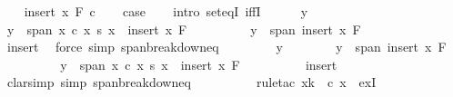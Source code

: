 \begin{isabellebody}
\isanewline
\ \ \isamarkupfalse%
\ {\isacharparenleft}{\kern0pt}insert\ x\ F\ c{\isacharparenright}{\kern0pt}\isanewline
\ \ \isamarkupfalse%
\ {\isacharquery}{\kern0pt}case\isanewline
\ \ \isamarkupfalse%
\ {\isacharparenleft}{\kern0pt}intro\ set{\isacharunderscore}{\kern0pt}eqI\ iffI{\isacharparenright}{\kern0pt}\isanewline
\ \ \ \ \isamarkupfalse%
\ y\isanewline
\ \ \ \ \ \ \isamarkupfalse%
\ {\isachardoublequoteopen}y\ {\isasymin}\ span\ {\isacharparenleft}{\kern0pt}{\isacharparenleft}{\kern0pt}{\isasymlambda}x{\isachardot}{\kern0pt}\ c\ x\ {\isacharasterisk}{\kern0pt}s\ x{\isacharparenright}{\kern0pt}\ {\isacharbackquote}{\kern0pt}\ insert\ x\ F{\isacharparenright}{\kern0pt}{\isachardoublequoteclose}\isanewline
\ \ \ \ \ \ \isamarkupfalse%
\ \isamarkupfalse%
\ {\isachardoublequoteopen}y\ {\isasymin}\ span\ {\isacharparenleft}{\kern0pt}insert\ x\ F{\isacharparenright}{\kern0pt}{\isachardoublequoteclose}\isanewline
\ \ \ \ \ \ \ \ \isamarkupfalse%
\ insert\ \isamarkupfalse%
\ {\isacharparenleft}{\kern0pt}force\ simp{\isacharcolon}{\kern0pt}\ span{\isacharunderscore}{\kern0pt}breakdown{\isacharunderscore}{\kern0pt}eq{\isacharparenright}{\kern0pt}\isanewline
\ \ \isamarkupfalse%
\isanewline
\ \ \ \ \isamarkupfalse%
\ y\isanewline
\ \ \ \ \ \ \isamarkupfalse%
\ {\isachardoublequoteopen}y\ {\isasymin}\ span\ {\isacharparenleft}{\kern0pt}insert\ x\ F{\isacharparenright}{\kern0pt}{\isachardoublequoteclose}\isanewline
\ \ \ \ \ \ \isamarkupfalse%
\ \isamarkupfalse%
\ {\isachardoublequoteopen}y\ {\isasymin}\ span\ {\isacharparenleft}{\kern0pt}{\isacharparenleft}{\kern0pt}{\isasymlambda}x{\isachardot}{\kern0pt}\ c\ x\ {\isacharasterisk}{\kern0pt}s\ x{\isacharparenright}{\kern0pt}\ {\isacharbackquote}{\kern0pt}\ insert\ x\ F{\isacharparenright}{\kern0pt}{\isachardoublequoteclose}\isanewline
\ \ \ \ \ \ \ \ \isamarkupfalse%
\ insert\isanewline
\ \ \ \ \ \ \ \ \isamarkupfalse%
\ {\isacharparenleft}{\kern0pt}clarsimp\ simp{\isacharcolon}{\kern0pt}\ span{\isacharunderscore}{\kern0pt}breakdown{\isacharunderscore}{\kern0pt}eq{\isacharparenright}{\kern0pt}\isanewline
\ \ \ \ \ \ \ \ \isamarkupfalse%
\ {\isacharparenleft}{\kern0pt}rule{\isacharunderscore}{\kern0pt}tac\ x{\isacharequal}{\kern0pt}{\isachardoublequoteopen}k\ {\isacharslash}{\kern0pt}\ c\ x{\isachardoublequoteclose}\ \ exI{\isacharparenright}{\kern0pt}\isanewline

\end{isabellebody}
